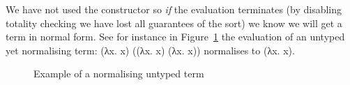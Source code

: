 We have not used the  constructor so \emph{if} the evaluation terminates
(by disabling totality checking we have lost all guarantees of the sort) we know
we will get a term in normal form. See for instance in
Figure~\ref{fig:normuntyped} the evaluation of an untyped yet normalising
term: {(λx. x) ((λx. x) (λx. x))} normalises to {(λx. x)}.

\begin{figure}[h]
\caption{Example of a normalising untyped term}
\label{fig:normuntyped}
\end{figure}
